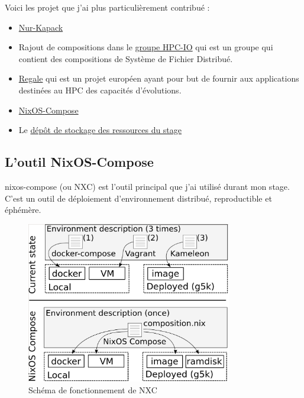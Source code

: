 \documentclass[a4paper,french,12pt, titlepage]{article}
\begin{document}
Voici les projet que j'ai plus particulièrement contribué :

\begin{itemize}
\item
  \href{https://github.com/oar-team/nur-kapack}{Nur-Kapack}
\item
  Rajout de compositions dans le
  \href{https://gitlab.inria.fr/nixos-compose/hpc-io}{groupe HPC-IO} qui
  est un groupe qui contient des compositions de Système de Fichier
  Distribué.
\item
  \href{https://gricad-gitlab.univ-grenoble-alpes.fr/regale/tools/regale-nixos-compose}{Regale}
  qui est un projet européen ayant pour but de fournir aux applications
  destinées au HPC des capacités d'évolutions.
\item
  \href{https://gitlab.inria.fr/nixos-compose/nixos-compose}{NixOS-Compose}
\item
  Le \href{https://gitlab.inria.fr/nixos-compose/stages/alithaud}{dépôt
  de stockage des ressources du stage}
\end{itemize}

\newpage

\hypertarget{loutil-nixos-compose}{%
\subsection{L'outil NixOS-Compose}\label{loutil-nixos-compose}}

\Gls{nixos-compose} (ou NXC) est l'outil principal que j'ai utilisé
durant mon stage. C'est un outil de déploiement d'environnement
distribué, reproductible et éphémère.\newline

\begin{figure}[h]
\centering
\includegraphics[width=0.8\textwidth,height=0.8\textheight,keepaspectratio]{images/shema-nxc.png}
\caption{Schéma de fonctionnement de NXC}
\end{figure}
\end{document}
